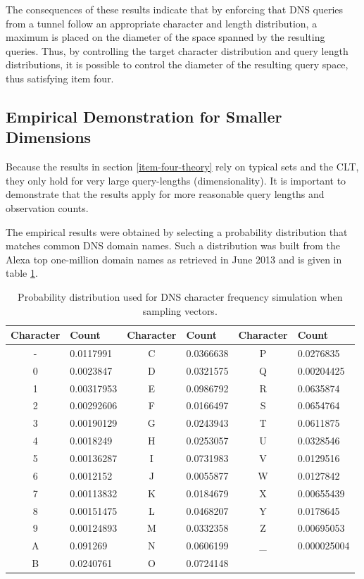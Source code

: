 \documentclass[12pt]{report}
\theoremstyle{remark}
\theoremstyle{definition}
\theoremstyle{definition}
\theoremstyle{definition}
\begin{document}
The consequences of these results indicate that by enforcing that DNS queries
from a tunnel follow an appropriate character and length distribution, a maximum
is placed on the diameter of the space spanned by the resulting queries. Thus,
by controlling the target character distribution and query length distributions,
it is possible to control the diameter of the resulting query space, thus
satisfying item four.

\subsection{Empirical Demonstration for Smaller Dimensions}
Because the results
in section \ref{item-four-theory} rely on typical sets and the CLT, they only
hold for very large query-lengths (dimensionality). It is important to
demonstrate that the results apply for more reasonable query lengths and
observation counts.

The empirical results were obtained by selecting a probability distribution that
matches common DNS domain names. Such a distribution was built from the Alexa
top one-million domain names as retrieved in June 2013 and is given in table
\ref{TABLE_dnssampling}.

\begin{table}[h]
\centering
\begin{tabular}{ | c | l || c | l || c | l | }
Character&Count&Character&Count&Character&Count\\
\hline
-& 0.0117991  &C& 0.0366638 &P& 0.0276835\\
0& 0.0023847  &D& 0.0321575 &Q& 0.00204425\\
1& 0.00317953 &E& 0.0986792 &R& 0.0635874\\
2& 0.00292606 &F& 0.0166497 &S& 0.0654764\\
3& 0.00190129 &G& 0.0243943 &T& 0.0611875\\
4& 0.0018249  &H& 0.0253057 &U& 0.0328546\\
5& 0.00136287 &I& 0.0731983 &V& 0.0129516\\
6& 0.0012152  &J& 0.0055877 &W& 0.0127842\\
7& 0.00113832 &K& 0.0184679 &X& 0.00655439\\
8& 0.00151475 &L& 0.0468207 &Y& 0.0178645\\
9& 0.00124893 &M& 0.0332358 &Z& 0.00695053\\
A& 0.091269   &N& 0.0606199 &\_& 0.000025004\\
B& 0.0240761  &O& 0.0724148 & & \\

\end{tabular}
\caption[Alexa Top One-Million Character Distribution]{Probability distribution
used for DNS character frequency simulation when sampling vectors.}
\label{TABLE_dnssampling}
\end{table}
\end{document}
